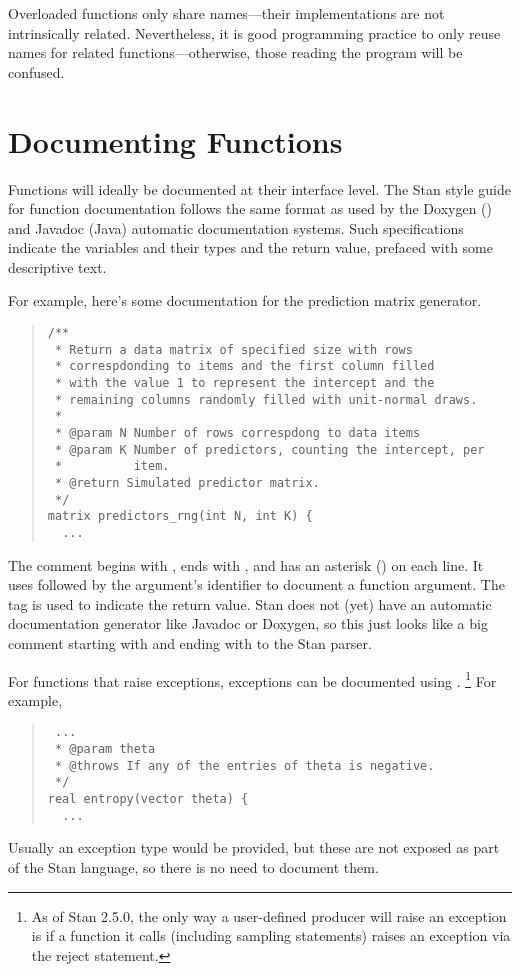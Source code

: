 Overloaded functions only share names---their implementations are not
intrinsically related.  Nevertheless, it is good programming practice
to only reuse names for related functions---otherwise, those reading
the program will be confused.


\section{Documenting Functions}\label{documenting-functions.section}

Functions will ideally be documented at their interface level.  The
Stan style guide for function documentation follows the same format as
used by the Doxygen (\Cpp) and Javadoc (Java) automatic documentation
systems.  Such specifications indicate the variables and their types
and the return value, prefaced with some descriptive text.

For example, here's some documentation for the prediction matrix
generator.
%
\begin{quote}
\begin{Verbatim}
/**
 * Return a data matrix of specified size with rows 
 * correspdonding to items and the first column filled 
 * with the value 1 to represent the intercept and the 
 * remaining columns randomly filled with unit-normal draws.
 *
 * @param N Number of rows correspdong to data items
 * @param K Number of predictors, counting the intercept, per
 *          item.
 * @return Simulated predictor matrix.
 */
matrix predictors_rng(int N, int K) { 
  ...
\end{Verbatim}
\end{quote}
%
The comment begins with \code{/**}, ends with \code{*/}, and has an
asterisk (\code{*}) on each line.  It uses  followed by
the argument's identifier to document a function argument.  The tag
 is used to indicate the return value.  Stan does not
(yet) have an automatic documentation generator like Javadoc or
Doxygen, so this just looks like a big comment starting with \code{/*}
and ending with \code{*/} to the Stan parser.

For functions that raise exceptions, exceptions can be documented using
.%
%
\footnote{As of Stan 2.5.0, the only way a user-defined
producer will raise an exception is if a function it calls (including
sampling statements) raises an exception via the reject statement.}
%
For example,
%
\begin{quote}
\begin{Verbatim}
 ...
 * @param theta 
 * @throws If any of the entries of theta is negative.
 */
real entropy(vector theta) {
  ...
\end{Verbatim}
\end{quote}
%
Usually an exception type would be provided, but these are not exposed
as part of the Stan language, so there is no need to document them.


